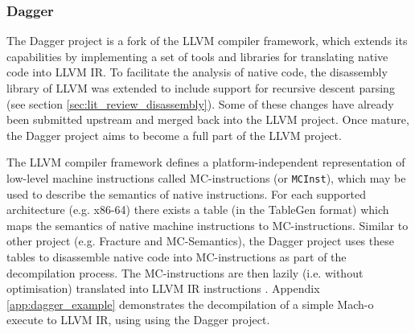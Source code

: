 
\subsubsection{Dagger}
\label{sec:rel_work_dagger}

The Dagger project is a fork of the LLVM compiler framework, which extends its capabilities by implementing a set of tools and libraries for translating native code into LLVM IR. To facilitate the analysis of native code, the disassembly library of LLVM was extended to include support for recursive descent parsing (see section \ref{sec:lit_review_disassembly}). Some of these changes have already been submitted upstream and merged back into the LLVM project. Once mature, the Dagger project aims to become a full part of the LLVM project.

The LLVM compiler framework defines a platform-independent representation of low-level machine instructions called MC-instructions (or \texttt{MCInst}), which may be used to describe the semantics of native instructions. For each supported architecture (e.g. x86-64) there exists a table (in the TableGen format) which maps the semantics of native machine instructions to MC-instructions. Similar to other project (e.g. Fracture and MC-Semantics), the Dagger project uses these tables to disassemble native code into MC-instructions as part of the decompilation process. The MC-instructions are then lazily (i.e. without optimisation) translated into LLVM IR instructions \cite{dagger}. Appendix \ref{app:dagger_example} demonstrates the decompilation of a simple Mach-o execute to LLVM IR, using using the Dagger project.
